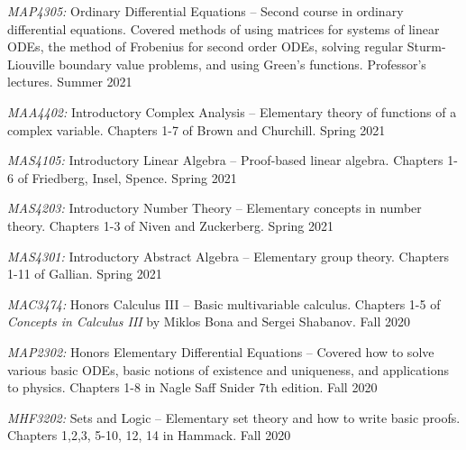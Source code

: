 \documentclass[11pt]{article}
\begin{document}
\textsl{MAP4305:} Ordinary Differential Equations -- Second course in ordinary differential equations. Covered methods of using matrices for systems of linear ODEs, the method of Frobenius for second order ODEs, solving regular Sturm-Liouville boundary value problems, and using Green's functions. Professor's lectures. Summer 2021

\textsl{MAA4402:} Introductory Complex Analysis -- Elementary theory of functions of a complex variable. Chapters 1-7 of Brown and Churchill. Spring 2021

\textsl{MAS4105:} Introductory Linear Algebra -- Proof-based linear algebra. Chapters 1-6 of Friedberg, Insel, Spence. Spring 2021

\textsl{MAS4203:} Introductory Number Theory -- Elementary concepts in number theory. Chapters 1-3 of Niven and Zuckerberg. Spring 2021

\textsl{MAS4301:} Introductory Abstract Algebra -- Elementary group theory. Chapters 1-11 of Gallian. Spring 2021

\textsl{MAC3474:} Honors Calculus III -- Basic multivariable calculus. Chapters 1-5 of \textsl{Concepts in Calculus III} by Miklos Bona and Sergei Shabanov. Fall 2020

\textsl{MAP2302:} Honors Elementary Differential Equations -- Covered how to solve various basic ODEs, basic notions of existence and uniqueness, and applications to physics. Chapters 1-8 in Nagle Saff Snider 7th edition. Fall 2020

\textsl{MHF3202:} Sets and Logic -- Elementary set theory and how to write basic proofs. Chapters 1,2,3, 5-10, 12, 14 in Hammack. Fall 2020
\end{document}

